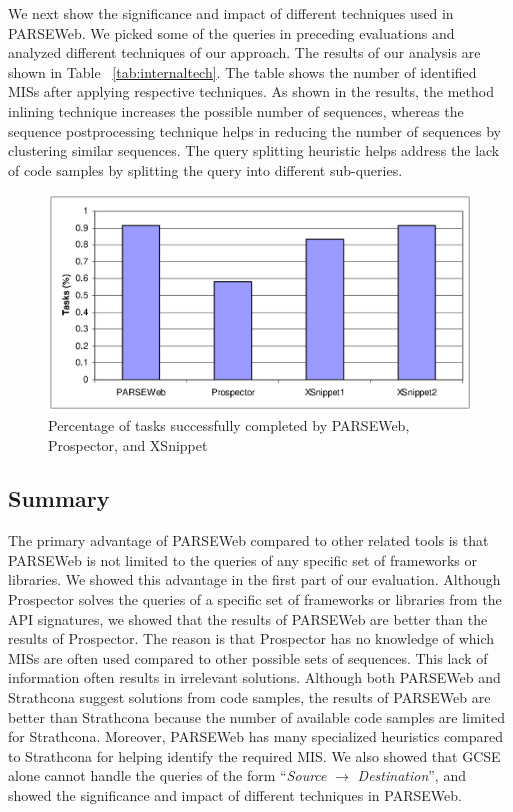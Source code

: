 We next show the significance and impact of different techniques
used in PARSEWeb. We picked some of the queries in preceding
evaluations and analyzed different techniques of our approach. The
results of our analysis are shown in Table ~\ref{tab:internaltech}.
The table shows the number of identified MISs after applying respective
techniques.  As shown in the results, the method inlining technique
increases the possible number of sequences, whereas the sequence
postprocessing technique helps in reducing the number of sequences
by clustering similar sequences. The query splitting heuristic helps
address the lack of code samples by splitting the query into
different sub-queries.
\begin{figure}[t]
\centering
\includegraphics[scale=0.5,clip]{ComparisonResults.eps}\vspace*{-2ex}
\caption{Percentage of tasks successfully completed by PARSEWeb,
Prospector, and XSnippet} \label{fig:resultschart} \vspace*{-3ex}
\end{figure}
\subsection{Summary}

The primary advantage of PARSEWeb compared to other related tools is
that PARSEWeb is not limited to the queries of any specific set of
frameworks or libraries. We showed this advantage in the first part
of our evaluation. Although Prospector solves the queries of a
specific set of frameworks or libraries from the API signatures, we
showed that the results of PARSEWeb are better than the results of
Prospector. The reason is that Prospector has no knowledge of which
MISs are often used compared to other
possible sets of sequences. This lack of information often results in
irrelevant solutions. Although both PARSEWeb and Strathcona suggest
solutions from code samples, the results of PARSEWeb are better than
Strathcona because the number of available code samples are limited
for Strathcona. Moreover, PARSEWeb has many specialized heuristics
compared to Strathcona for helping identify the required MIS. We
also showed that GCSE alone cannot handle the queries of the form
``\emph{Source} $\rightarrow$ \emph{Destination}'', and showed the
significance and impact of different techniques in PARSEWeb.
